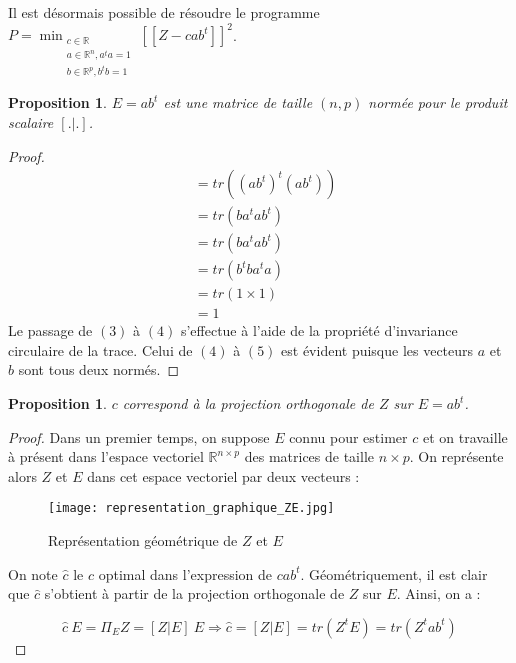 \documentclass[12pt, openany, fleqn, french]{article}
\newtheorem{prop}[theo]{Proposition}    %
\begin{document}
    Il est désormais possible de résoudre le programme $P = \displaystyle \min_{\substack{c \in \mathbb{R} \\ a \in \mathbb{R}^{n}, a^{t}a=1 \\ b \in \mathbb{R}^{p} , b^{t}b=1}}[\![Z-cab^{t}]\!]^{2}$. \\
    

\begin{prop}
$E=ab^{t}$ est une matrice de taille $(n,p)$ normée pour le produit scalaire $[.|.]$.
\end{prop}
\begin{proof}
    \begin{align}
        [ab^{t}|ab^{t}] &= tr((ab^{t})^{t}(ab^{t})) \\
                        &= tr(ba^{t}ab^{t}) \\
                        &= tr(ba^{t}ab^{t}) \\
                        &= tr(b^{t}ba^{t}a) \\
                        &= tr(1\times 1) \\
                        &= 1
    \end{align}
     Le passage de $(3)$ à $(4)$ s'effectue à l'aide de la propriété d'invariance circulaire de la trace. Celui de $(4)$ à $(5)$ est évident puisque les vecteurs $a$ et $b$ sont tous deux normés.
\end{proof}

\begin{prop}
$c$ correspond à la projection orthogonale de $Z$ sur $E = ab^t$.
\end{prop}
\begin{proof}
     Dans un premier temps, on suppose $E$ connu pour estimer $c$ et on travaille à présent dans l'espace vectoriel $\mathbb{R}^{n\times p}$ des matrices de taille $n\times p$. On représente alors $Z$ et $E$ dans cet espace vectoriel par deux vecteurs :

    \hspace{2cm}

    \begin{figure}[H]
	   \begin{minipage}[b]{1.0\linewidth}
	   \texttt{[image: representation\_graphique\_ZE.jpg]}
		  \centering\caption{Représentation géométrique de $Z$ et $E$}
	   \end{minipage}\hfill	
    \end{figure}

   

    \hspace{2cm}

    On note $\hat{c}$ le $c$ optimal dans l'expression de $cab^t$. Géométriquement, il est clair que $\hat{c}$ s'obtient à partir de la projection orthogonale de $Z$ sur $E$. Ainsi, on a :


      $$\hat{c} ~ E = \Pi_E Z = [Z|E] ~E \Rightarrow \hat{c}= [Z|E] = tr(Z^tE)=tr(Z^tab^t)$$
  

\end{proof}
\end{document}
